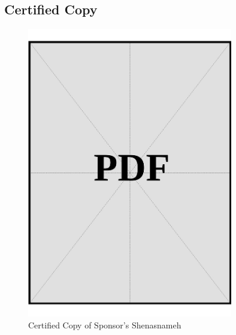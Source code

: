 \subsection*{Certified Copy}
\vspace*{\fill}
\begin{figure}[h]
    \centering
    \includegraphics[page=1, width=0.8\textwidth]{../application-docs/sponsor/identification/shenasnameh/certified-copies.pdf}
    \caption{Certified Copy of Sponsor's Shenasnameh}
    \label{fig:sponsor-shenasnameh-certified-copy}
\end{figure}
\vspace*{\fill}
\clearpage
